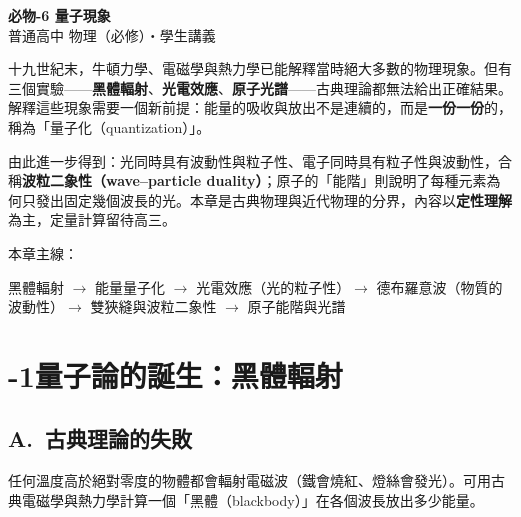 \documentclass[11pt]{article}
\begin{document}
\begin{center}
{\sffamily\Huge\bfseries 必物-6 量子現象}\\[3pt]
{\sffamily\large 普通高中 物理（必修）・學生講義}
\end{center}
\vspace{0.6em}

十九世紀末，牛頓力學、電磁學與熱力學已能解釋當時絕大多數的物理現象。但有三個實驗——\textbf{黑體輻射}、\textbf{光電效應}、\textbf{原子光譜}——古典理論都無法給出正確結果。解釋這些現象需要一個新前提：能量的吸收與放出不是連續的，而是\textbf{一份一份}的，稱為「量子化（quantization）」。

由此進一步得到：光同時具有波動性與粒子性、電子同時具有粒子性與波動性，合稱\textbf{波粒二象性（wave–particle duality）}；原子的「能階」則說明了每種元素為何只發出固定幾個波長的光。本章是古典物理與近代物理的分界，內容以\textbf{定性理解}為主，定量計算留待高三。

\medskip
本章主線：

\begin{center}
黑體輻射 $\rightarrow$ 能量量子化 $\rightarrow$ 光電效應（光的粒子性）$\rightarrow$ 德布羅意波（物質的波動性）$\rightarrow$ 雙狹縫與波粒二象性 $\rightarrow$ 原子能階與光譜
\end{center}

\section*{-1\quad 量子論的誕生：黑體輻射}

\subsection*{\sffamily A.\ 古典理論的失敗}

任何溫度高於絕對零度的物體都會輻射電磁波（鐵會燒紅、燈絲會發光）。可用古典電磁學與熱力學計算一個「黑體（blackbody）」在各個波長放出多少能量。
\end{document}
